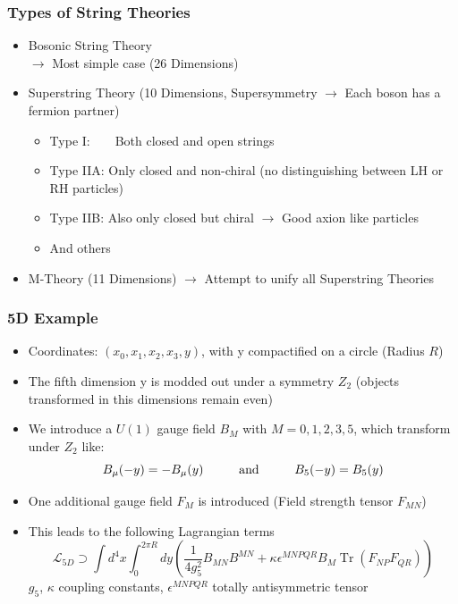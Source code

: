 \documentclass[aspectratio=1610, 9pt]{beamer}
\DeclareMathOperator{\Tr}{Tr}
\begin{document}
\begin{frame}
	\frametitle{Types of String Theories}
		\begin{itemize}
			\item Bosonic String Theory\\
			$\rightarrow$ Most simple case (26 Dimensions) 
			\item Superstring Theory (10 Dimensions, Supersymmetry $\rightarrow$ Each boson has a fermion partner)\\
			\begin{itemize}
				\item[\ ]{\color{tugreen!60!black}Type I:}\ \ \ \ Both closed and open strings
				\item[\ ]{\color{tugreen!60!black}Type IIA:} Only closed and non-chiral (no distinguishing between LH or RH particles)
				\item[\ ]{\color{tugreen!60!black}Type IIB:} Also only closed but chiral $\rightarrow$ Good axion like particles
				\item[\ ]{\color{tugreen!60!black}And others}
			\end{itemize}
			\item M-Theory (11 Dimensions)
			$\rightarrow$ Attempt to unify all Superstring Theories
		\end{itemize}
\end{frame}


\begin{frame}
	\frametitle{5D Example}
	
	\begin{itemize}
		\item Coordinates: $(x_0, x_1, x_2, x_3, y)$, with y compactified on a circle (Radius $R$) 
		\item The fifth dimension y is modded out under a symmetry $Z_2$ (objects transformed in this dimensions remain even)
		\item We introduce a $U(1)$ gauge field $B_M$ with $M = 0,1,2,3,5$, which transform under $Z_2$ like:
		\begin{equation*}
			B_{\mu}(-y) = -B_{\mu}(y)\hspace{1 cm}\text{and}\hspace{1cm}  B_5(-y) = B_5(y)
		\end{equation*}	
		\item One additional gauge field $F_M$ is introduced (Field strength tensor $F_{MN}$)
		\item This leads to the following Lagrangian terms
		\begin{equation*}
			\mathcal{L}_{5D} \supset \int d^4x \int_0^{2\pi R} dy \left( \frac{1}{4 g_5^2} B_{MN} B^{MN} + \kappa \epsilon^{MNPQR} B_M \Tr(F_{NP} F_{QR}) \right)
		\end{equation*}
		$g_5$, $\kappa$ coupling constants, $\epsilon^{MNPQR}$ totally antisymmetric tensor
	\end{itemize}
\end{frame}
\end{document}
